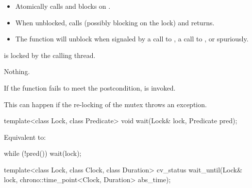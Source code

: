 \begin{itemdescr}
\pnum
{}%
\effects
\begin{itemize}
\item Atomically calls  and blocks on .
\item When unblocked, calls  (possibly blocking on the lock) and returns.
\item The function will unblock when signaled by a call to ,
a call to , or spuriously.
\end{itemize}

\pnum
\ensures
{} is locked by the calling thread.

\pnum
\throws
Nothing.

\pnum
\remarks
If the function fails to meet the postcondition, 
is invoked.
\begin{note}
This can happen if the re-locking of the mutex throws an exception.
\end{note}
\end{itemdescr}

%
\begin{itemdecl}
template<class Lock, class Predicate>
  void wait(Lock& lock, Predicate pred);
\end{itemdecl}

\begin{itemdescr}
\pnum
\effects
Equivalent to:
\begin{codeblock}
while (!pred())
  wait(lock);
\end{codeblock}
\end{itemdescr}

%
\begin{itemdecl}
template<class Lock, class Clock, class Duration>
  cv_status wait_until(Lock& lock, chrono::time_point<Clock, Duration> abs_time);
\end{itemdecl}

